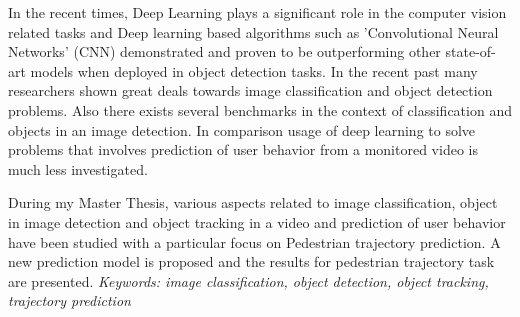 % 
% 
%
\begin{flushleft}
In the recent times, Deep Learning plays a significant role in the computer vision
related tasks and Deep learning based algorithms such as 'Convolutional Neural Networks'
(CNN) demonstrated and proven to be outperforming other state-of-art models when 
deployed in object detection tasks. In the recent past many researchers shown great 
deals towards image classification and object detection problems. Also there exists several 
benchmarks in the context of classification and objects in an image detection. In 
comparison usage of deep learning to solve problems that involves prediction of 
user behavior from a monitored video is much less investigated.
\baselineskip
\par
During my Master Thesis, various aspects related to image classification, object 
in image detection and object tracking in a video and prediction of user behavior 
have been studied with a particular focus on Pedestrian trajectory prediction. 
A new prediction model is proposed and the results for pedestrian trajectory 
task are presented.
\baselineskip
\textit{Keywords: image classification, object detection, object tracking, trajectory prediction}
\end{flushleft}
